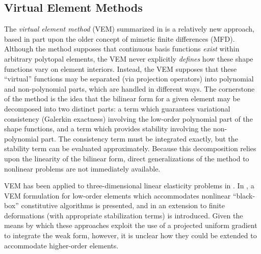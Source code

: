	\subsection*{Virtual Element Methods}
		The \textit{virtual element method} (VEM) summarized in \cite{Veiga:13} is a relatively new approach, based in part upon the older concept of mimetic finite differences (MFD). Although the method supposes that continuous basis functions \textit{exist} within arbitrary polytopal elements, the VEM never explicitly \textit{defines} how these shape functions vary on element interiors. Instead, the VEM supposes that these ``virtual'' functions may be separated (via projection operators) into polynomial and non-polynomial parts, which are handled in different ways. The cornerstone of the method is the idea that the bilinear form for a given element may be decomposed into two distinct parts: a term which guarantees variational consistency (Galerkin exactness) involving the low-order polynomial part of the shape functions, and a term which provides stability involving the non-polynomial part. The consistency term must be integrated exactly, but the stability term can be evaluated approximately. Because this decomposition relies upon the linearity of the bilinear form, direct generalizations of the method to nonlinear problems are not immediately available.
		
		VEM has been applied to three-dimensional linear elasticity problems in \cite{Gain:13}. In \cite{Veiga:15}, a VEM formulation for low-order elements which accommodates nonlinear ``black-box'' constitutive algorithms is presented, and in \cite{Chi:17} an extension to finite deformations (with appropriate stabilization terms) is introduced. Given the means by which these approaches exploit the use of a projected uniform gradient to integrate the weak form, however, it is unclear how they could be extended to accommodate higher-order elements.
		

